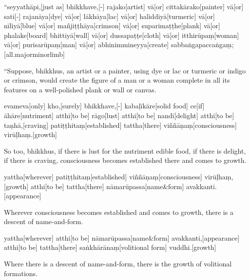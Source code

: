 \vskip 0.2in
\begin{samepage}
\begingl[glneveryline={\PaliGlossA,\PaliGlossB}]
“seyyathāpi,[just as] bhikkhave,[-] rajako[artist] vā[or] cittakārako[painter] vā[or] sati[-] rajanāya[dye] vā[or] lākhāya[lac] vā[or] haliddiyā[turmeric] vā[or] nīliyā[blue] vā[or] mañjiṭṭhāya[crimson] vā[or] suparimaṭṭhe[plank] vā[or] phalake[board] bhittiyā[wall] vā[or] dussapaṭṭe[cloth] vā[or] itthirūpaṃ[woman] vā[or] purisarūpaṃ[man] vā[or] abhinimmineyya[create] sabbaṅgapaccaṅgaṃ;[all.majorminorlimb]
\endgl
\nopagebreak
\linespread{0.5}
\begin{spacin}{0.2}
{\PaliGlossFT “Suppose, bhikkhus, an artist or a painter, using dye or lac or turmeric or indigo or crimson,  would create the figure of a man or a woman complete in all its features on a well-polished plank or wall or canvas.}
\end{spacin}
\vskip 12pt
\end{samepage}
\begin{samepage}
\begingl[glneveryline={\PaliGlossA,\PaliGlossB}]
evameva[only] kho,[surely] bhikkhave,[-] kabaḷīkāre[solid food] ce[if] āhāre[nutriment] atthi[to be] rāgo[lust] atthi[to be] nandī[delight] atthi[to be] taṇhā,[craving] patiṭṭhitaṃ[established] tattha[there] viññāṇaṃ[consciousness] virūḷhaṃ.[growth]
\endgl
\nopagebreak
\linespread{0.5}
\begin{spacin}{0.2}
{\PaliGlossFT So too, bhikkhus, if there is lust for the nutriment edible food, if there is delight, if there is craving, consciousness becomes established there and comes to growth.}
\end{spacin}
\vskip 12pt
\end{samepage}
\begin{samepage}
\begingl[glneveryline={\PaliGlossA,\PaliGlossB}]
yattha[wherever] patiṭṭhitaṃ[established] viññāṇaṃ[consciousness] virūḷhaṃ,[growth] atthi[to be] tattha[there] nāmarūpassa[name\&form] avakkanti.[appearance]
\endgl
\nopagebreak
\linespread{0.5}
\begin{spacin}{0.2}
{\PaliGlossFT Wherever consciousness becomes established and comes to growth, there is a descent of name-and-form.}
\end{spacin}
\vskip 12pt
\end{samepage}
\begin{samepage}
\begingl[glneveryline={\PaliGlossA,\PaliGlossB}]
yattha[wherever] atthi[to be] nāmarūpassa[name\&form] avakkanti,[appearance] atthi[to be] tattha[there] saṅkhārānaṃ[volitional form] vuddhi.[growth]
\endgl
\nopagebreak
\linespread{0.5}
\begin{spacin}{0.2}
{\PaliGlossFT Where there is a descent of name-and-form, there is the growth of volitional formations.}
\end{spacin}
\vskip 12pt
\end{samepage}
